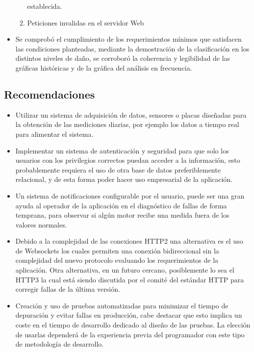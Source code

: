 \begin{itemize}
\begin{enumerate}
                establecida.
            \item Peticiones invalidas en el servidor Web
        \end{enumerate}
    \item Se comprobó el cumplimiento de
        los requerimientos mínimos que satisfacen las condiciones planteadas,
        mediante la
        demostración de la clasificación en los distintos niveles de daño,
         se corroboró la coherencia y legibilidad
        de las gráficas históricas y de la gráfica del análisis en frecuencia.
\end{itemize}



\subsection{Recomendaciones}
\begin{itemize}
    \item Utilizar un sistema de adquisición de datos, sensores o placas diseñadas
        para la obtención de las mediciones diarias, por ejemplo los datos a tiempo
        real para alimentar el sistema.

    \item  Implementar un sistema de autenticación y seguridad para que solo
        los usuarios con los
        privilegios correctos puedan acceder a la información, esto
        probablemente requiera el uso de otra base de datos preferiblemente
        relacional, y de esta forma poder hacer uso empresarial
        de la aplicación.

    \item Un sistema de notificaciones configurable por el usuario,
        puede ser una gran ayuda al operador de la aplicación en el diagnóstico
        de fallas de forma temprana, para observar si algún motor recibe una
        medida fuera de los valores normales.

    \item Debido a la complejidad de las conexiones HTTP2 una alternativa es el
        uso de Websockets los cuales permiten una conexión bidireccional sin la
        complejidad del nuevo protocolo evaluando  los requerimientos
        de la aplicación. Otra alternativa, en un futuro
        cercano, posiblemente lo sea el HTTP3 la cual está siendo discutida
        por el comité del estándar HTTP para corregir fallas de la última
        versión.

    \item Creación y uso de  pruebas automatizadas para minimizar el tiempo de
        depuración y evitar fallas en producción, cabe destacar que esto
        implica un coste
        en el tiempo de desarrollo dedicado al diseño de las pruebas.
        La elección de usarlas dependerá de la experiencia previa
        del programador con este tipo de metodología de desarrollo.


\end{itemize}
